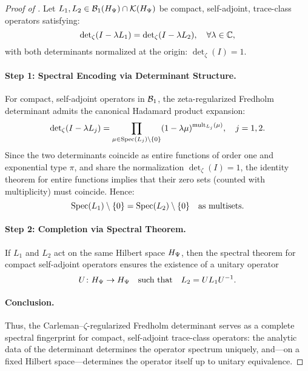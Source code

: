 \begin{proof}[Proof of ]
Let \( L_1, L_2 \in \mathcal{B}_1(H_{\Psi}) \cap \mathcal{K}(H_{\Psi}) \) be compact, self-adjoint, trace-class operators satisfying:
\[
\det\nolimits_\zeta(I - \lambda L_1) = \det\nolimits_\zeta(I - \lambda L_2), \quad \forall \lambda \in \mathbb{C},
\]
with both determinants normalized at the origin: \( \det\nolimits_\zeta(I) = 1 \).

\paragraph{Step 1: Spectral Encoding via Determinant Structure.}
For compact, self-adjoint operators in \( \mathcal{B}_1 \), the zeta-regularized Fredholm determinant admits the canonical Hadamard product expansion:
\[
\det\nolimits_\zeta(I - \lambda L_j) = \prod_{\mu \in \operatorname{Spec}(L_j) \setminus \{0\}} (1 - \lambda \mu)^{\operatorname{mult}_{L_j}(\mu)},
\quad j = 1,2.
\]
Since the two determinants coincide as entire functions of order one and exponential type \( \pi \), and share the normalization \( \det\nolimits_\zeta(I) = 1 \), the identity theorem for entire functions implies that their zero sets (counted with multiplicity) must coincide. Hence:
\[
\operatorname{Spec}(L_1) \setminus \{0\} = \operatorname{Spec}(L_2) \setminus \{0\}
\quad \text{as multisets}.
\]

\paragraph{Step 2: Completion via Spectral Theorem.}
If \( L_1 \) and \( L_2 \) act on the same Hilbert space \( H_{\Psi} \), then the spectral theorem for compact self-adjoint operators ensures the existence of a unitary operator
\[
U \colon H_{\Psi} \to H_{\Psi}
\quad \text{such that} \quad
L_2 = U L_1 U^{-1}.
\]

\paragraph{Conclusion.}
Thus, the Carleman–\(\zeta\)-regularized Fredholm determinant serves as a complete spectral fingerprint for compact, self-adjoint trace-class operators: the analytic data of the determinant determines the operator spectrum uniquely, and—on a fixed Hilbert space—determines the operator itself up to unitary equivalence.
\end{proof}
